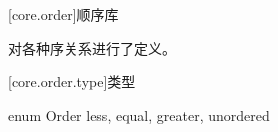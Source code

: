 
[core.order]{顺序库}

\pnum
{}对各种序关系进行了定义。

[core.order.type]{类型}

\begin{codeblock}
enum Order {
    less,
    equal,
    greater,
    unordered
}
\end{codeblock}